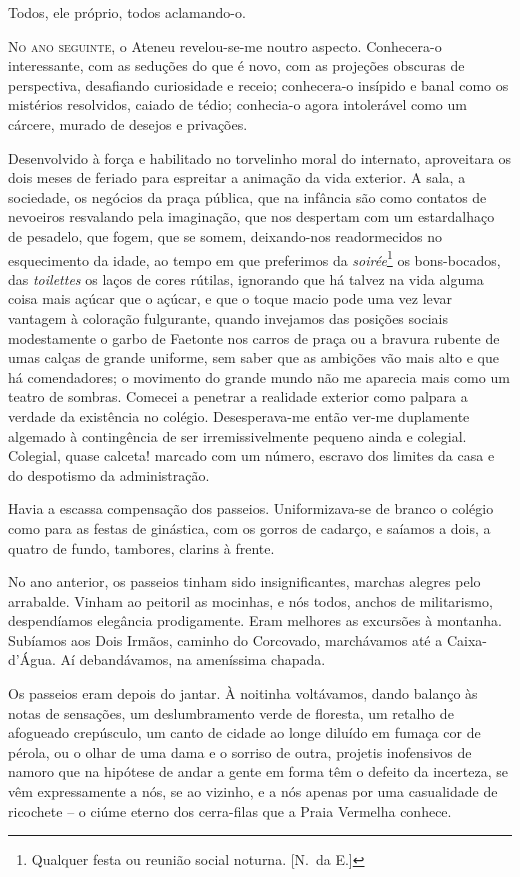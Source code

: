 Todos, ele próprio, todos aclamando{}-o. 

\sectionitem

\noindent\textsc{No ano seguinte}, o Ateneu revelou{}-se{}-me noutro aspecto.
Conhecera{}-o interessante, com as seduções do que é novo, com as
projeções obscuras de perspectiva, desafiando curiosidade e receio;
conhecera{}-o insípido e banal como os mistérios resolvidos, caiado de
tédio; conhecia{}-o agora intolerável como um cárcere, murado de
desejos e privações. 

Desenvolvido à força e habilitado no torvelinho
moral do internato, aproveitara os dois meses de feriado para espreitar
a animação da vida exterior. A sala, a sociedade, os negócios da praça
pública, que na infância são como contatos de nevoeiros resvalando pela
imaginação, que nos despertam com um estardalhaço de pesadelo, que
fogem, que se somem, deixando{}-nos readormecidos no esquecimento da
idade, ao tempo em que preferimos da \textit{soirée}\footnote{ Qualquer festa ou 
reunião social noturna. [N.~da E.]} os bons{}-bocados, das
\textit{toilettes} os laços de cores rútilas, ignorando que há talvez na vida
alguma coisa mais açúcar que o açúcar, e que o toque macio pode uma vez
levar vantagem à coloração fulgurante, quando invejamos das posições
sociais modestamente o garbo de Faetonte nos carros de praça ou a
bravura rubente de umas calças de grande uniforme, sem saber que as
ambições vão mais alto e que há comendadores; o movimento do grande
mundo não me aparecia mais como um teatro de sombras. Comecei a
penetrar a realidade exterior como palpara a verdade da existência no
colégio. Desesperava{}-me então ver{}-me duplamente algemado à
contingência de ser irremissivelmente pequeno ainda e colegial.
Colegial, quase calceta! marcado com um número, escravo dos limites da
casa e do despotismo da administração. 

Havia a escassa compensação dos
passeios. Uniformizava{}-se de branco o colégio como para as festas de
ginástica, com os gorros de cadarço, e saíamos a dois, a quatro de
fundo, tambores, clarins à frente. 

No ano anterior, os passeios tinham
sido insignificantes, marchas alegres pelo arrabalde. Vinham ao
peitoril as mocinhas, e nós todos, anchos de militarismo, despendíamos
elegância prodigamente. Eram melhores as excursões à montanha. Subíamos
aos Dois Irmãos, caminho do Corcovado, marchávamos até a
Caixa{}-d'Água. Aí debandávamos, na ameníssima chapada. 

Os passeios
eram depois do jantar. À noitinha voltávamos, dando balanço às notas de
sensações, um deslumbramento verde de floresta, um retalho de afogueado
crepúsculo, um canto de cidade ao longe diluído em fumaça cor de
pérola, ou o olhar de uma dama e o sorriso de outra, projetis
inofensivos de namoro que na hipótese de andar a gente em forma têm o
defeito da incerteza, se vêm expressamente a nós, se ao vizinho, e a
nós apenas por uma casualidade de ricochete -- o ciúme eterno dos
cerra{}-filas que a Praia Vermelha conhece. 


